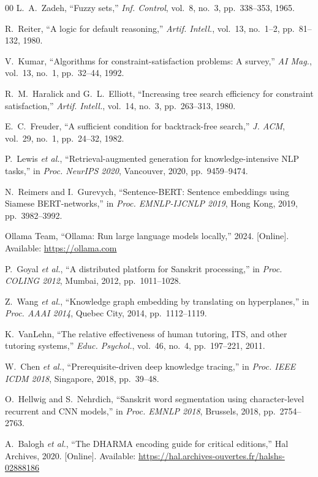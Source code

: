 \documentclass[conference]{IEEEtran}
\begin{document}
\begin{thebibliography}{00}
L.~A.~Zadeh, ``Fuzzy sets,''
\textit{Inf. Control}, vol.~8, no.~3, pp.~338--353, 1965.

R.~Reiter, ``A logic for default reasoning,''
\textit{Artif. Intell.}, vol.~13, no.~1--2, pp.~81--132, 1980.

V.~Kumar,
``Algorithms for constraint-satisfaction problems: A survey,''
\textit{AI Mag.}, vol.~13, no.~1, pp.~32--44, 1992.

R.~M.~Haralick and G.~L.~Elliott,
``Increasing tree search efficiency for constraint satisfaction,''
\textit{Artif. Intell.}, vol.~14, no.~3, pp.~263--313, 1980.

E.~C.~Freuder,
``A sufficient condition for backtrack-free search,''
\textit{J. ACM}, vol.~29, no.~1, pp.~24--32, 1982.

P.~Lewis \textit{et al.},
``Retrieval-augmented generation for knowledge-intensive NLP tasks,''
in \textit{Proc. NeurIPS 2020}, Vancouver, 2020, pp.~9459--9474.

N.~Reimers and I.~Gurevych,
``Sentence-BERT: Sentence embeddings using Siamese BERT-networks,''
in \textit{Proc. EMNLP-IJCNLP 2019}, Hong Kong, 2019, pp.~3982--3992.

Ollama Team,
``Ollama: Run large language models locally,''
2024. [Online]. Available: \url{https://ollama.com}

P.~Goyal \textit{et al.},
``A distributed platform for Sanskrit processing,''
in \textit{Proc. COLING 2012}, Mumbai, 2012, pp.~1011--1028.

Z.~Wang \textit{et al.},
``Knowledge graph embedding by translating on hyperplanes,''
in \textit{Proc. AAAI 2014}, Quebec City, 2014, pp.~1112--1119.

K.~VanLehn,
``The relative effectiveness of human tutoring, ITS, and other tutoring systems,''
\textit{Educ. Psychol.}, vol.~46, no.~4, pp.~197--221, 2011.

W.~Chen \textit{et al.},
``Prerequisite-driven deep knowledge tracing,''
in \textit{Proc. IEEE ICDM 2018}, Singapore, 2018, pp.~39--48.

O.~Hellwig and S.~Nehrdich,
``Sanskrit word segmentation using character-level recurrent and CNN models,''
in \textit{Proc. EMNLP 2018}, Brussels, 2018, pp.~2754--2763.

A.~Balogh \textit{et al.},
``The DHARMA encoding guide for critical editions,''
Hal Archives, 2020.
[Online]. Available: \url{https://hal.archives-ouvertes.fr/halshs-02888186}

\end{thebibliography}
\end{document}
